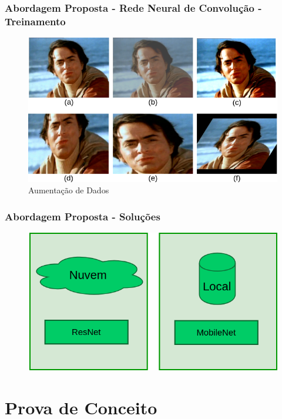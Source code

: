 \documentclass{beamer}
\begin{document}
\begin{frame}
\frametitle{Abordagem Proposta - Rede Neural de Convolução - Treinamento}
\begin{figure}
\centering
\includegraphics[scale=0.33]{figuras/augmentation.png}
\caption{Aumentação de Dados}
\label{fig:augmentation}
\end{figure}
\end{frame}


\begin{frame}
\frametitle{Abordagem Proposta - Soluções}
\begin{figure}
\centering
\includegraphics[scale=0.35]{figuras/abordagem_7.png}
\label{fig:arquitetura3}
\end{figure}
\end{frame}


\section{Prova de Conceito}
\end{document}
